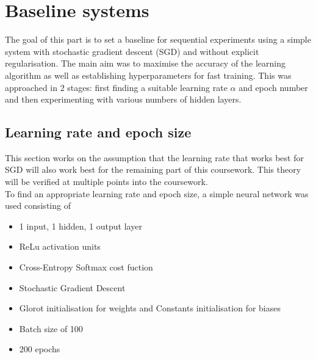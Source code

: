 \documentclass{article}
\begin{document}
\section{Baseline systems}

The goal of this part is to set a baseline for sequential experiments using a simple system with stochastic gradient descent (SGD) and without explicit regularisation. The main aim was to maximise the accuracy of the learning algorithm as well as establishing hyperparameters for fast training. This was approached in 2 stages: first finding a suitable learning rate $\alpha$ and epoch number and then experimenting with various numbers of hidden layers.

\subsection{Learning rate and epoch size}
This section works on the assumption that the learning rate that works best for SGD will also work best for the remaining part of this coursework. This theory will be verified at multiple points into the coursework.
\\
To find an appropriate learning rate and epoch size, a simple neural network was used consisting of
\begin{itemize}
    \itemsep0em 
    \item 1 input, 1 hidden, 1 output layer
    \item ReLu activation units
    \item Cross-Entropy Softmax cost fuction
    \item Stochastic Gradient Descent
    \item Glorot initialisation for weights and Constants initialisation for biases
    \item Batch size of 100
    \item 200 epochs
\end{itemize}
\end{document}
